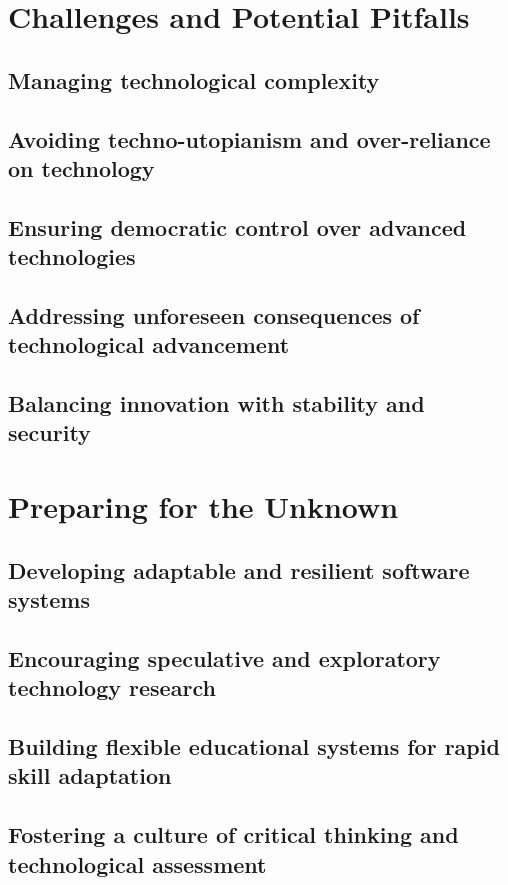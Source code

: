 \newpage

\section{Challenges and Potential Pitfalls}
\subsection{Managing technological complexity}
\subsection{Avoiding techno-utopianism and over-reliance on technology}
\subsection{Ensuring democratic control over advanced technologies}
\subsection{Addressing unforeseen consequences of technological advancement}
\subsection{Balancing innovation with stability and security}

\newpage

\section{Preparing for the Unknown}
\subsection{Developing adaptable and resilient software systems}
\subsection{Encouraging speculative and exploratory technology research}
\subsection{Building flexible educational systems for rapid skill adaptation}
\subsection{Fostering a culture of critical thinking and technological assessment}


